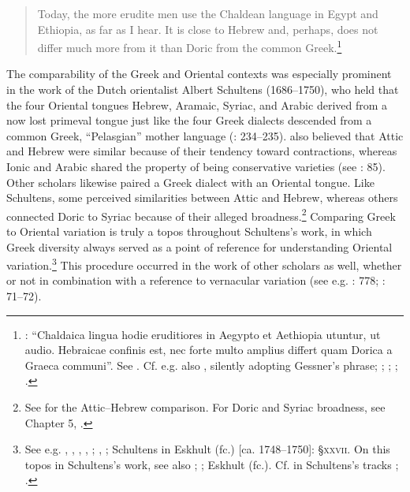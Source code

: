 \begin{quote}
Today, the more erudite men use the Chaldean language in Egypt and Ethiopia, as far as I hear. It is close to Hebrew and, perhaps, does not differ much more from it than Doric from the common Greek.\footnote{\citet[15\textsc{\textsuperscript{r}}]{Gessner1555}: “Chaldaica lingua hodie eruditiores in Aegypto et Aethiopia utuntur, ut audio. Hebraicae confinis est, nec forte multo amplius differt quam Dorica a Graeca communi”. See \citet[43]{Peters1970}. Cf. e.g. also \citet[325]{Rocca1591}, silently adopting Gessner’s phrase; \citet[459]{Saumaise1643a}; \citet[88]{Bagnati1732}; \citet[24]{Wesley1736}; \citet[22]{Eichhorn1780}.}
\end{quote}

The comparability of the Greek and Oriental contexts was especially prominent in the work of the Dutch orientalist Albert Schultens (1686–1750), who held that the four Oriental tongues Hebrew, Aramaic, Syriac, and Arabic derived from a now lost primeval tongue just like the four Greek dialects descended from a common Greek, “Pelasgian” mother language (\citealt{Schultens1739}: 234–235). \citet[\textsc{xcvi}]{Schultens1748} also believed that Attic and Hebrew were similar because of their tendency toward contractions, whereas Ionic and Arabic shared the property of being conservative varieties (see \citealt{Eskhult2015}: 85). Other scholars likewise paired a Greek dialect with an Oriental tongue. Like Schultens, some perceived similarities between Attic and Hebrew, whereas others connected Doric to Syriac because of their alleged broadness.\footnote{See \citet[425--432]{Lakemacher1730} for the Attic–Hebrew comparison. For Doric and Syriac broadness, see Chapter 5, .} Comparing Greek to Oriental variation is truly a topos throughout Schultens’s work, in which Greek diversity always served as a point of reference for understanding Oriental variation.\footnote{See e.g. \citet[490]{Schultens1769}, \citet[4]{Schultens1732}, \citet[5]{Schultens1737}, \citet[19--21]{Schultens1738a}, \citet[106--107, stressing that the Oriental and the Germanic contexts were less comparable]{Schultens1738b}; \citet[187]{Schultens1739}, \citet[\textsc{xcvi}]{Schultens1748}; Schultens in Eskhult (fc.) [ca. 1748–1750]: §\textsc{xxvii}. On this topos in Schultens’s work, see also \citet[105]{Fuck1955}; \citet[707]{Covington1979}; Eskhult (fc.). Cf. in Schultens’s tracks \citet[5]{Polier1739}; \citet{Groddeck1747}.} This procedure occurred in the work of other scholars as well, whether or not in combination with a reference to vernacular variation (see e.g. \citealt{Bochart1646}: 778; \citealt{Blount1680}: 71–72).

